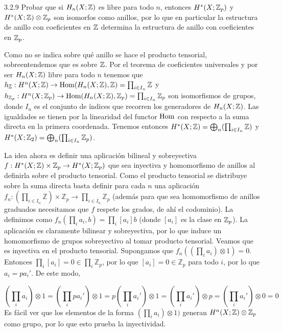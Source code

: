 \documentclass[twoside]{article}
\begin{document}
\begin{ejercicio}{3.2.9}
Probar que si $H_n(X; \mathbb{Z})$ es libre para todo $n$, entonces $H^*(X; \mathbb{Z}_p)$ y $H^*(X; \mathbb{Z})\otimes \mathbb{Z}_p$ son isomorfos como anillos, por lo que en particular la estructura de anillo con coeficientes en $\mathbb{Z}$ determina la estructura de anillo con coeficientes en $\mathbb{Z}_p$. 

\end{ejercicio}
\begin{solucion}

Como no se indica sobre qué anillo se hace el producto tensorial, sobreentendemos que es sobre $\mathbb{Z}$. Por el teorema de coeficientes universales y por ser $H_n(X;\mathbb{Z})$ libre para todo $n$ tenemos que $h_{\mathbb{Z}}:H^n(X;\mathbb{Z})\to\operatorname{Hom}(H_n(X;\mathbb{Z}),\mathbb{Z})=\prod_{i\in I_n}\mathbb{Z}$ y $h_{\mathbb{Z}_p}:H^n(X;\mathbb{Z}_p)\to\operatorname{Hom}(H_n(X;\mathbb{Z}),\mathbb{Z}_p)=\prod_{i\in I_n}\mathbb{Z}_p$ son isomorfismos de grupos, donde $I_n$ es el conjunto de índices que recorren los generadores de $H_n(X;\mathbb{Z})$. Las igualdades se tienen por la linearidad del functor $\operatorname{Hom}$ con respecto a la suma directa en la primera coordenada. Tenemos entonces $H^*(X;\mathbb{Z})=\bigoplus_n(\prod_{i\in I_n}\mathbb{Z})$ y $H^*(X;\mathbb{Z}_2)=\bigoplus_n(\prod_{i\in I_n}\mathbb{Z}_p)$.

La idea ahora es definir una aplicación bilineal y sobreyectiva $f:H^*(X;\mathbb{Z})\times \mathbb{Z}_p\to H^*(X;\mathbb{Z}_p)$ que sea inyectiva y homomorfismo de anillos al definirla sobre el producto tensorial. Como el producto tensorial se distribuye sobre la suma directa basta definir para cada $n$ una aplicación $f_n:(\prod_{i\in I_n}\mathbb{Z})\times\mathbb{Z}_p\to \prod_{i\in I_n}\mathbb{Z}_p$ (además para que sea homomorfismo de anillos graduados necesitamos que $f$ respete los grados, de ahí el codominio). La definimos como $f_n(\prod_i a_i,b)=\prod_i [a_i] b$ (donde $[a_i]$ es la clase en $\mathbb{Z}_p$). La aplicación es claramente bilinear y sobreyectiva, por lo que induce un homomorfismo de grupos sobreyectivo al tomar producto tensorial. Veamos que es inyectiva en el producto tensorial. Supongamos que $f_n((\prod_ia_i)\otimes 1)=0$. Entonces $\prod_i[a_i]=0\in\prod_i\mathbb{Z}_p$, por lo que $[a_i]=0\in\mathbb{Z}_p$ para todo $i$, por lo que $a_i=pa_i'$. De este modo, 

$$\left(\prod_ia_i\right)\otimes 1=\left(\prod_i pa_i'\right)\otimes 1=p\left(\prod_ia_i'\right)\otimes 1=\left(\prod_ia_i'\right)\otimes p=\left(\prod_ia_i'\right)\otimes 0=0$$
Es fácil ver que los elementos de la forma $(\prod_ia_i)\otimes 1)$ generan $H^n(X;\mathbb{Z})\otimes\mathbb{Z}_p$ como grupo, por lo que esto prueba la inyectividad. 


\end{solucion}
\end{document}
